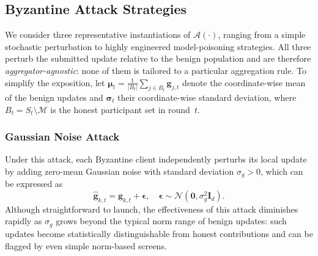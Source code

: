 \documentclass[journal]{IEEEtran}
\begin{document}
\subsection{Byzantine Attack Strategies}

We consider three representative instantiations of $\mathcal{A}(\cdot)$, ranging from a simple stochastic perturbation to highly engineered model-poisoning strategies. All three perturb the submitted update relative to the benign population and are therefore \emph{aggregator-agnostic}: none of them is tailored to a particular aggregation rule. To simplify the exposition, let $\boldsymbol{\mu}_t = \frac{1}{|B_t|} \sum_{j \in B_t} \mathbf{g}_{j,t}$ denote the coordinate-wise mean of the benign updates and $\boldsymbol{\sigma}_t$ their coordinate-wise standard deviation, where $B_t = S_t \setminus \mathcal{M}$ is the honest participant set in round~$t$.

\subsubsection{Gaussian Noise Attack}
Under this attack, each Byzantine client independently perturbs its local update by adding zero-mean Gaussian noise with standard deviation $\sigma_g > 0$, which can be expressed as
\begin{equation}
\hat{\mathbf{g}}_{k,t} = \mathbf{g}_{k,t} + \boldsymbol{\epsilon}, \quad \boldsymbol{\epsilon} \sim \mathcal{N}(\mathbf{0}, \sigma_g^2 \mathbf{I}_d).
\label{eq:gaussian_attack}
\end{equation}
Although straightforward to launch, the effectiveness of this attack diminishes rapidly as $\sigma_g$ grows beyond the typical norm range of benign updates: such updates become statistically distinguishable from honest contributions and can be flagged by even simple norm-based screens.
\end{document}
